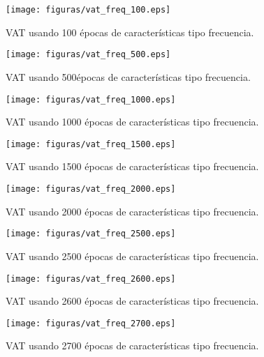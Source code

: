 \begin{figure}[H]
	\centering
	\texttt{[image: figuras/vat\_freq\_100.eps]}
	\caption{VAT usando 100 épocas de características tipo frecuencia.}
	\label{vat: vat_freq_100}
\end{figure}
\begin{figure}[H]
	\centering
	\texttt{[image: figuras/vat\_freq\_500.eps]}
	\caption{VAT usando 500épocas de características tipo frecuencia.}
	\label{vat: vat_freq_500}
\end{figure}
\begin{figure}[H]
	\centering
	\texttt{[image: figuras/vat\_freq\_1000.eps]}
	\caption{VAT usando 1000 épocas de características tipo frecuencia.}
	\label{vat: vat_freq_1000}
\end{figure}
\begin{figure}[H]
	\centering
	\texttt{[image: figuras/vat\_freq\_1500.eps]}
	\caption{VAT usando 1500 épocas de características tipo frecuencia.}
	\label{vat: vat_freq_1500}
\end{figure}
\begin{figure}[H]
	\centering
	\texttt{[image: figuras/vat\_freq\_2000.eps]}
	\caption{VAT usando 2000 épocas de características tipo frecuencia.}
	\label{vat: vat_freq_2000}
\end{figure}
\begin{figure}[H]
\centering
\texttt{[image: figuras/vat\_freq\_2500.eps]}
\caption{VAT usando 2500 épocas de características tipo frecuencia.}
\label{vat: vat_freq_2500}
\end{figure}
\begin{figure}[H]
	\centering
	\texttt{[image: figuras/vat\_freq\_2600.eps]}
	\caption{VAT usando 2600 épocas de características tipo frecuencia.}
	\label{vat: vat_freq_2600}
\end{figure}
\begin{figure}[H]
	\centering
	\texttt{[image: figuras/vat\_freq\_2700.eps]}
	\caption{VAT usando 2700 épocas de características tipo frecuencia.}
	\label{vat: vat_freq_2700}
\end{figure}

